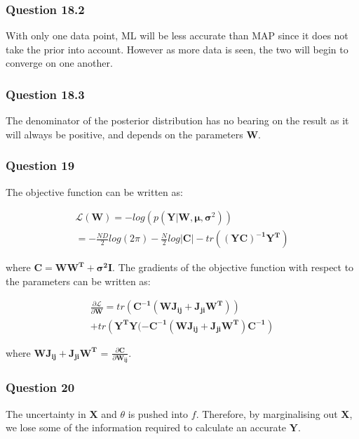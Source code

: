 \documentclass[10pt, a4paper, twocolumn]{article} %
\begin{document}

\subsubsection*{Question 18.2}
With only one data point, ML will be less accurate than MAP since it does not take the prior into account. However as more data is seen, the two will begin to converge on one another. 

\subsubsection*{Question 18.3}
The denominator of the posterior distribution has no bearing on the result as it will always be positive, and depends on the parameters $\mathbf{W}$. 

\subsubsection*{Question 19}

The objective function can be written as:

\begin{multline}
  \mathcal{L}(\mathbf{W}) = -log(p(\mathbf{Y}|\mathbf{W}, \bm{\mu}, \bm{\sigma}^2)) \\
  = -\frac{ND}{2}log(2\pi) - \frac{N}{2}log|\mathbf{C}| - tr(\mathbf{(YC)^{-1}Y^T})
\end{multline}

where $\mathbf{C} = \mathbf{WW^T} + \bm{\sigma^2}\mathbf{I}$. The gradients of the objective function with respect to the parameters can be written as:

\begin{multline}
  \frac{\partial \mathcal{L}}{\partial \mathbf{W}} = tr(\mathbf{C^{-1}(WJ_{ij} +  J_{ji}W^T)}) \\
  + tr(\mathbf{Y^TY(-C^{-1}(WJ_{ij} +  J_{ji}W^T)C^{-1}})
\end{multline}

where $\mathbf{WJ_{ij} +  J_{ji}W^T}$ = $\frac{\partial \mathbf{C}}{\partial \mathbf{W_{ij}}}$.

\subsubsection*{Question 20}
The uncertainty in $\mathbf{X}$ and $\theta$ is pushed into $f$. Therefore, by marginalising out $\mathbf{X}$, we lose some of the information required to calculate an accurate $\mathbf{Y}$.
\end{document}
